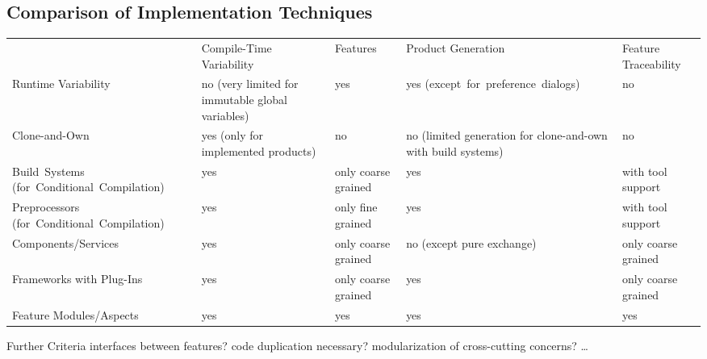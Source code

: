 \subsection{Comparison of Implementation Techniques}
\begin{frame}[fragile]{\myframetitle}
	\centering
	\renewcommand{\arraystretch}{1.2}
	\newcommand{\myexception}[1]{\tiny{}(#1)}
	\begin{tabular}{p{32mm}p{32mm}p{14mm}p{27mm}p{14mm}}
		 & Compile-Time Variability & Features & Product Generation & Feature \mbox{Traceability} \pause\\\rowcolor{gray}
		Runtime Variability & no \myexception{very limited for immutable global variables} & yes & yes \mbox{\myexception{except for preference dialogs}} & no \pause\\
		Clone-and-Own & yes \linebreak\myexception{only for implemented products} & no & no \myexception{limited generation for clone-and-own with build systems} & no \pause\\\rowcolor{gray}
		\mbox{Build Systems} \mbox{\myexception{for Conditional Compilation}} & yes & only coarse grained & yes & with tool support \pause\\
		Preprocessors \mbox{\myexception{for Conditional Compilation}} & yes & only fine grained & yes & with tool support \pause\\\rowcolor{gray}
		Components/Services & yes & only coarse grained & no \linebreak\myexception{except pure exchange} & only coarse grained \pause\\
		Frameworks with Plug-Ins & yes & only coarse grained & yes & only coarse grained \pause\\\rowcolor{gray}
		Feature Modules/Aspects & yes & yes & yes & yes \pause\\
	\end{tabular}
	\begin{note}{Further Criteria}
		interfaces between features? code duplication necessary? modularization of cross-cutting concerns? \ldots
	\end{note}
\end{frame}

